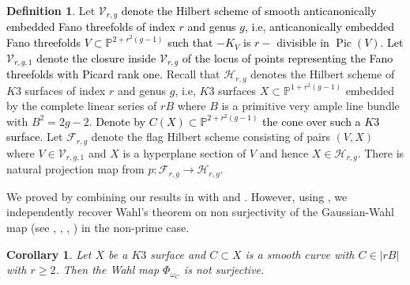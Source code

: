 \documentclass[11pt,twoside]{amsart}
\theoremstyle{plain}
\numberwithin{equation}{section}
\newtheorem{proposition}[theorem]{Proposition}
\newtheorem{corollary}[theorem]{Corollary}
\theoremstyle{definition}
\newtheorem{definition}[theorem]{Definition}
\begin{document}


\begin{definition}\label{Hilbert scheme of Fanos and K3}
    Let \textcolor{black}{$\mathcal{V}_{r,g}$ denote the Hilbert scheme of smooth anticanonically embedded Fano threefolds of index $r$ and genus $g$, i.e, anticanonically embedded Fano threefolds $V \subset \mathbb{P}^{2+r^2(g-1)}$ such that $-K_V$ is $r-$ divisible in $\operatorname{Pic}(V)$. Let $\mathcal{V}_{r,g,1}$ denote the closure inside $\mathcal{V}_{r,g}$ of the locus of points representing the Fano threefolds with Picard rank one.} Recall that $\mathcal{H}_{r,g}$ denotes the Hilbert scheme of $K3$ surfaces of index $r$ and genus $g$, i.e, $K3$ surfaces $X \subset \mathbb{P}^{1+r^2(g-1)}$ embedded by the complete linear series of $rB$ where $B$ is a primitive very ample line bundle with $B^2 = 2g-2$. \textcolor{black}{Denote by $C(X) \subset \mathbb{P}^{2+r^2(g-1)}$ the cone over such a $K3$ surface.} Let $\mathcal{F}_{r,g}$ denote the flag Hilbert scheme consisting of pairs $(V,X)$ where $V \in \mathcal{V}_{r,g,1}$ and $X$ is a hyperplane section of $V$ and hence $X \in \mathcal{H}_{r,g}$. There is natural projection map from $p: \mathcal{F}_{r,g} \to \mathcal{H}_{r,g}$.
\end{definition}

\color{black}
 We proved  by combining our results in  with \cite{CDS20} and \cite{ABS17}. However, using , we independently recover Wahl's theorem on non surjectivity of the Gaussian-Wahl map (see \cite{W87},  \cite{BM87}, \cite{CM90}, \cite{V92}) in the non-prime case.

\begin{corollary}\label{Wahl}
 Let $X$ be a $K3$ surface and $C \subset X$ is a smooth curve with $C \in |rB|$ with $r \geq 2$. Then the Wahl map $\Phi_{\omega_C}$ is not surjective. 
\end{corollary}
\end{document}

